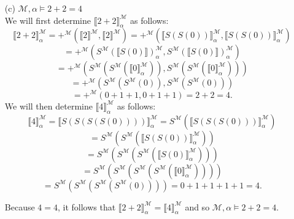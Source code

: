 \begin{enumerate}
  \item[(c)] $\mathcal{M},\alpha\vDash2+2=4$\\
    We will first determine
    $\llbracket 2 + 2 \rrbracket ^\mathcal{M}_\alpha$
    as follows:
    \[\llbracket 2 + 2 \rrbracket ^\mathcal{M}_\alpha = +^\mathcal{M}(\llbracket 2 \rrbracket ^\mathcal{M},\llbracket 2 \rrbracket ^\mathcal{M})= +^\mathcal{M}(\llbracket S(S(0))\rrbracket ^\mathcal{M}_\alpha, \llbracket S(S(0))\rrbracket ^\mathcal{M}_\alpha) \]
    \[= +^\mathcal{M}(S^\mathcal{M}(\llbracket S(0)\rrbracket ) ^\mathcal{M}_\alpha, S^\mathcal{M}(\llbracket S(0)\rrbracket) ^\mathcal{M}_\alpha)\]
    \[=+^\mathcal{M}(S^\mathcal{M}(S^\mathcal{M}(\llbracket 0 \rrbracket ^\mathcal{M}_\alpha)),S^\mathcal{M}(S^\mathcal{M}(\llbracket 0 \rrbracket ^\mathcal{M}_\alpha)))\]
    \[ = +^\mathcal{M}(S^\mathcal{M}(S^\mathcal{M}(0)),S^\mathcal{M}(S^\mathcal{M}(0)))\]
    \[= +^\mathcal{M}(0 + 1 + 1,0 + 1 + 1) = 2 + 2= 4.\]
    We will then determine
    $\llbracket 4 \rrbracket ^\mathcal{M}_\alpha$
    as follows:
    \[\llbracket 4 \rrbracket ^\mathcal{M}_\alpha = \llbracket S(S(S(S(0))))\rrbracket^\mathcal{M}_\alpha = S^\mathcal{M}(\llbracket S(S(S(0))) \rrbracket ^\mathcal{M}_\alpha ) \]
    \[= S^\mathcal{M}(S^\mathcal{M}(\llbracket S(S(0)) \rrbracket ^\mathcal{M}_\alpha))\]
    \[= S^\mathcal{M}(S^\mathcal{M}(S^\mathcal{M}(\llbracket S(0) \rrbracket ^\mathcal{M}_\alpha )))\]
    \[= S^\mathcal{M}(S^\mathcal{M}(S^\mathcal{M}(S^\mathcal{M}(\llbracket 0 \rrbracket ^\mathcal{M}_\alpha ))))\]
    \[= S^\mathcal{M}(S^\mathcal{M}(S^\mathcal{M}(S^\mathcal{M}(0)))) = 0 + 1 + 1 + 1 + 1 = 4.\]
   
    Because $4 = 4$, it follows that
    $\llbracket 2+2\rrbracket_{\alpha}^{\mathcal{M}}=\llbracket 4\rrbracket^{\mathcal{M}}_{\alpha}$
    and so
    $\mathcal{M},\alpha\vDash2+2=4$.



\end{enumerate}
